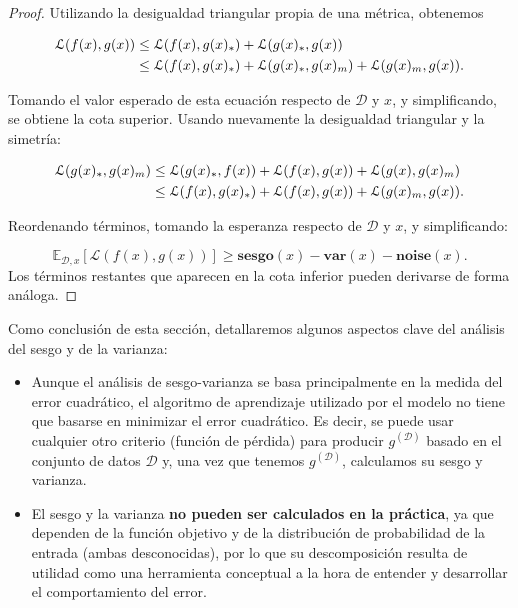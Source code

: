 \begin{proof}
    Utilizando la desigualdad triangular propia de una métrica, obtenemos

    \begin{align}
        \mathcal{L}(f(x), g(x)) 
        &\leq \mathcal{L}(f(x), g(x)_*) + \mathcal{L}(g(x)_*, g(x)) \notag \\
        &\leq \mathcal{L}(f(x), g(x)_*) + \mathcal{L}(g(x)_*, g(x)_m) + \mathcal{L}(g(x)_m, g(x)).
    \end{align}
    

    Tomando el valor esperado de esta ecuación respecto de $\mathcal{D}$ y $x$, y simplificando, se obtiene la cota superior. Usando nuevamente la desigualdad triangular y la simetría:

    \begin{align}
        \mathcal{L}(g(x)_*, g(x)_m) 
        &\leq \mathcal{L}(g(x)_*, f(x)) + \mathcal{L}(f(x), g(x)) + \mathcal{L}(g(x), g(x)_m) \notag \\
        &\leq \mathcal{L}(f(x), g(x)_*) + \mathcal{L}(f(x), g(x)) + \mathcal{L}(g(x)_m, g(x)).
    \end{align}

    Reordenando términos, tomando la esperanza respecto de $\mathcal{D}$ y $x$, y simplificando: 

    \[
        \mathbb{E}_{\mathcal{D}, x}[\mathcal{L}(f(x), g(x))] \geq \textbf{sesgo}(x) - \textbf{var}(x) - \textbf{noise}(x).
    \]
    Los términos restantes que aparecen en la cota inferior pueden derivarse de forma análoga.
\end{proof}


Como conclusión de esta sección, detallaremos algunos aspectos clave del análisis del sesgo y de la varianza:

\begin{itemize}
    \item Aunque el análisis de sesgo-varianza se basa principalmente en la medida del error cuadrático, el algoritmo de aprendizaje utilizado por el modelo no tiene que basarse en minimizar el error cuadrático. Es decir, se puede usar cualquier otro criterio (función de pérdida) para producir $g^{\mathcal{(D)}}$ basado en el conjunto de datos $\mathcal{D}$ y, una vez que tenemos $g^{\mathcal{(D)}}$, calculamos su sesgo y varianza.
    \item El sesgo y la varianza \textbf{no pueden ser calculados en la práctica}, ya que dependen de la función objetivo y de la distribución de probabilidad de la entrada (ambas desconocidas), por lo que su descomposición resulta de utilidad como una herramienta conceptual a la hora de entender y desarrollar el comportamiento del error.
    
\end{itemize}

